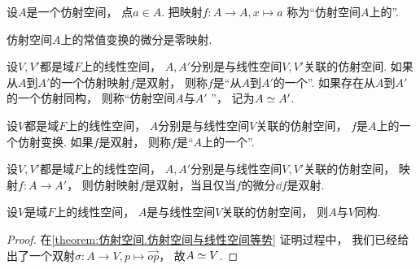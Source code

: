 \begin{definition}%
设\(A\)是一个仿射空间，
点\(a \in A\).
把映射\(f\colon A \to A, x \mapsto a\)
称为“仿射空间\(A\)上的”.
\end{definition}

\begin{proposition}%
仿射空间\(A\)上的常值变换的微分是零映射.
\end{proposition}

\begin{definition}%
设\(V,V'\)都是域\(F\)上的线性空间，
\(A,A'\)分别是与线性空间\(V,V'\)关联的仿射空间.
如果从\(A\)到\(A'\)的一个仿射映射\(f\)是双射，
则称\(f\)是“从\(A\)到\(A'\)的一个”.
如果存在从\(A\)到\(A'\)的一个仿射同构，
则称“仿射空间\(A\)与\(A'\) ”，
记为\(A \simeq A'\).
\end{definition}

\begin{definition}%
设\(V\)都是域\(F\)上的线性空间，
\(A\)分别是与线性空间\(V\)关联的仿射空间，
\(f\)是\(A\)上的一个仿射变换.
如果\(f\)是双射，
则称\(f\)是“\(A\)上的一个”.
\end{definition}

\begin{proposition}%
设\(V,V'\)都是域\(F\)上的线性空间，
\(A,A'\)分别是与线性空间\(V,V'\)关联的仿射空间，
映射\(f\colon A \to A'\)，
则仿射映射\(f\)是双射，当且仅当\(f\)的微分\(\dd{f}\)是双射.
\end{proposition}

\begin{proposition}\label{theorem:仿射空间.仿射空间与线性空间同构}
设\(V\)是域\(F\)上的线性空间，
\(A\)是与线性空间\(V\)关联的仿射空间，
则\(A\)与\(V\)同构.
\begin{proof}
在\cref{theorem:仿射空间.仿射空间与线性空间等势} 证明过程中，
我们已经给出了一个双射\(\sigma\colon A \to V, p \mapsto \vec{op}\)，
故\(A \simeq V\).
\end{proof}
\end{proposition}

